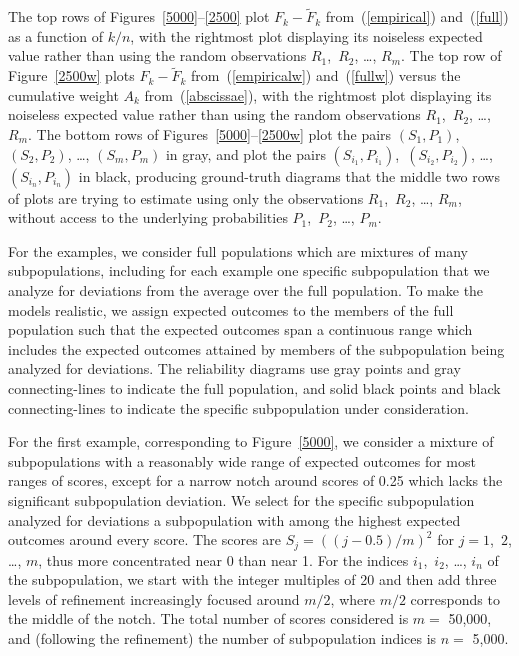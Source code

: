 \documentclass{article}
\begin{document}
The top rows of Figures~\ref{5000}--\ref{2500} plot $F_k-\tilde{F}_k$
from~(\ref{empirical}) and~(\ref{full}) as a function of $k/n$,
with the rightmost plot displaying its noiseless expected value
rather than using the random observations $R_1$,~$R_2$, \dots, $R_m$.
The top row of Figure~\ref{2500w} plots $F_k-\tilde{F}_k$
from~(\ref{empiricalw}) and~(\ref{fullw}) versus
the cumulative weight $A_k$ from~(\ref{abscissae}),
with the rightmost plot displaying its noiseless expected value
rather than using the random observations $R_1$,~$R_2$, \dots, $R_m$.
The bottom rows of Figures~\ref{5000}--\ref{2500w} plot the pairs
$(S_1, P_1)$,~$(S_2, P_2)$, \dots, $(S_m, P_m)$ in gray, and plot the pairs
$(S_{i_1}, P_{i_1})$,~$(S_{i_2}, P_{i_2})$, \dots, $(S_{i_n}, P_{i_n})$
in black, producing ground-truth diagrams that the middle two rows of plots
are trying to estimate using only the observations $R_1$,~$R_2$, \dots, $R_m$,
without access to the underlying probabilities $P_1$,~$P_2$, \dots, $P_m$.

For the examples, we consider full populations which are mixtures
of many subpopulations, including for each example one specific subpopulation
that we analyze for deviations from the average over the full population.
To make the models realistic, we assign expected outcomes to the members
of the full population such that the expected outcomes span a continuous range
which includes the expected outcomes attained by members of the subpopulation
being analyzed for deviations. The reliability diagrams use gray points
and gray connecting-lines to indicate the full population,
and solid black points and black connecting-lines to indicate
the specific subpopulation under consideration.

For the first example, corresponding to Figure~\ref{5000},
we consider a mixture of subpopulations with a reasonably wide range
of expected outcomes for most ranges of scores, except for a narrow notch
around scores of 0.25 which lacks the significant subpopulation deviation.
We select for the specific subpopulation analyzed for deviations
a subpopulation with among the highest expected outcomes around every score.
The scores are $S_j = ((j - 0.5) / m)^2$ for $j = 1$,~$2$, \dots, $m$,
thus more concentrated near 0 than near 1.
For the indices $i_1$,~$i_2$, \dots, $i_n$ of the subpopulation, we start
with the integer multiples of 20 and then add three levels of refinement
increasingly focused around $m/2$,
where $m/2$ corresponds to the middle of the notch.
The total number of scores considered is $m =$ 50,000, and
(following the refinement) the number of subpopulation indices is $n =$ 5,000.
\end{document}
